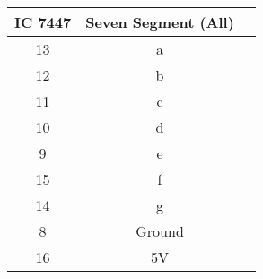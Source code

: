 \begin{tabular}{|c|c|c|}
\hline
IC 7447 & Seven Segment (All)\\
\hline
13 & a\\
\hline
12 & b\\
\hline
11 & c\\
\hline
10 & d\\
\hline
9 & e\\
\hline
15 & f\\
\hline
14 & g\\
\hline
8 & Ground\\
\hline
16 & 5V \\
\hline
\end{tabular}
